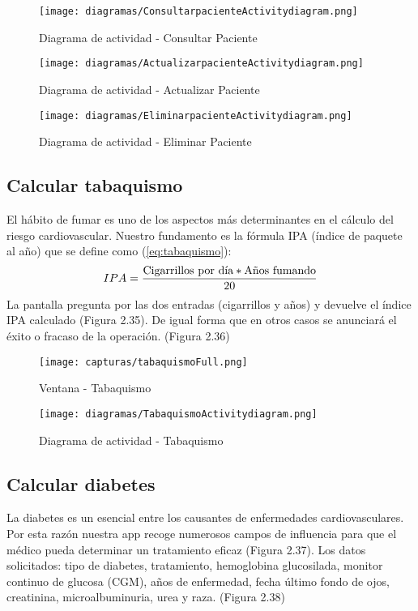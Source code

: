 \documentclass[11pt,spanish,
		listoftables,listoffigures]
		{tfgplantilla}
\begin{document}
\begin{figure}[H]
\centering
\texttt{[image: diagramas/ConsultarpacienteActivitydiagram.png]}
\caption{Diagrama de actividad - Consultar Paciente}
\end{figure}

\begin{figure}[H]
\centering
\texttt{[image: diagramas/ActualizarpacienteActivitydiagram.png]}
\caption{Diagrama de actividad - Actualizar Paciente}
\end{figure}

\begin{figure}[H]
\centering
\texttt{[image: diagramas/EliminarpacienteActivitydiagram.png]}
\caption{Diagrama de actividad - Eliminar Paciente}
\end{figure}

\subsection {Calcular tabaquismo}

El hábito de fumar es uno de los aspectos más determinantes en el cálculo del riesgo cardiovascular. Nuestro fundamento es la fórmula IPA (índice de paquete al año) que se define como (\ref{eq:tabaquismo}):
\begin{equation}\label{eq:tabaquismo}
IPA = \frac{\textup{Cigarrillos por día} * \textup{Años fumando}}{20}
\end{equation}
La pantalla pregunta por las dos entradas (cigarrillos y años) y devuelve el índice IPA calculado (Figura 2.35). De igual forma que en otros casos se anunciará el éxito o fracaso de la operación. (Figura 2.36)

\begin{figure}[H]
\centering
\texttt{[image: capturas/tabaquismoFull.png]}
\caption{Ventana - Tabaquismo}
\end{figure}

\newpage
\begin{figure}[H]
\centering
\texttt{[image: diagramas/TabaquismoActivitydiagram.png]}
\caption{Diagrama de actividad - Tabaquismo}
\end{figure}

\newpage
\subsection {Calcular diabetes}

La diabetes es un esencial entre los causantes de enfermedades cardiovasculares. Por esta razón nuestra app recoge numerosos campos de influencia para que el médico pueda determinar un tratamiento eficaz (Figura 2.37). Los datos solicitados: tipo de diabetes, tratamiento, hemoglobina glucosilada, monitor continuo de glucosa (CGM), años de enfermedad, fecha último fondo de ojos, creatinina, microalbuminuria, urea y raza. (Figura 2.38)
\end{document}
